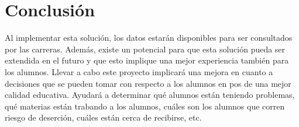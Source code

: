 \section[Conclusión]{Conclusión}

Al implementar esta solución, los datos estarán disponibles para ser consultados por las carreras. Además, existe un potencial para que esta solución pueda ser extendida en el futuro y que esto implique una mejor experiencia también para los alumnos.
Llevar a cabo este proyecto implicará una mejora en cuanto a decisiones que se pueden tomar con respecto a los alumnos en pos de una mejor calidad educativa. Ayudará a determinar qué alumnos están teniendo problemas, qué materias están trabando a los alumnos, cuáles son los alumnos que corren riesgo de deserción, cuáles están cerca de recibirse, etc.




